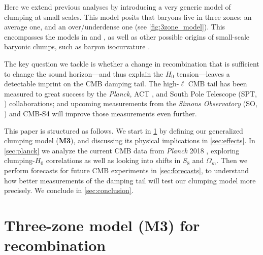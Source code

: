 Here we extend previous analyses by introducing a very generic model of clumping at small scales. This model posits that baryons live in three zones: an average one, and an over/underdense one (see \cref{fig:3zone_model}). This encompasses the models in \citet{JP20} and \citet{clumping-ACT}, as well as other possible origins of small-scale baryonic clumps, such as baryon isocurvature \citep{baryon-isocurvature}.

The key question we tackle is whether a change in recombination that is sufficient to change the sound horizon---and thus explain the $H_0$ tension---leaves a detectable imprint on the CMB damping tail. 
The high-$\ell$ CMB tail has been measured to great success by the {\it Planck}, ACT \citep{ACT}, and South Pole Telescope (SPT, \cite{SPT}) collaborations; and upcoming measurements from the {\it Simons Observatory} (SO, \cite{SO}) and CMB-S4 \citep{CMBS4white} will improve those measurements even further.


This paper is structured as follows.
We start in \cref{sec:M3model} by defining our generalized clumping model ({\bf M3}), and discussing its physical implications in \cref{sec:effects}.
In \cref{sec:planck} we analyze the current CMB data from {\it Planck} 2018 \citep{planck_ttee,planck_lensing}, exploring clumping-$H_0$ correlations as well as looking into shifts in $S_8$ and $\Omega_m$. 
Then we perform forecasts for future CMB experiments in \cref{sec:forecasts}, to understand how better measurements of the damping tail will test our clumping model more precisely.
We conclude in \cref{sec:conclusion}.
    
\section{Three-zone model (M3) for recombination}
\label{sec:M3model}

